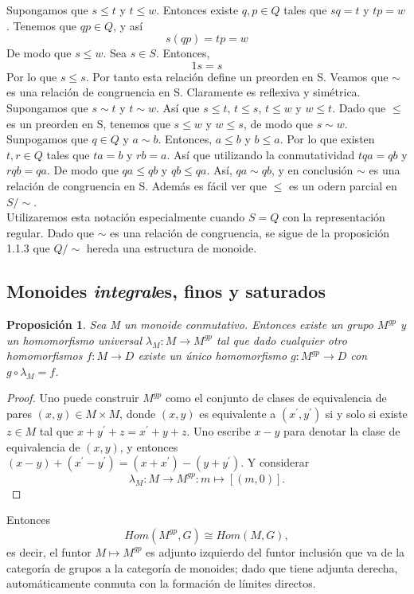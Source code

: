 \documentclass[12pt,spanish]{amsart}
\newtheorem{prop}[Theorem]{Proposición}
\theoremstyle{definition}
\theoremstyle{remark}
\begin{document}
Supongamos que $s\leq t$ y $t\leq w$. Entonces existe $q,p\in Q$ tales que $sq=t$ y $tp=w$. Tenemos que $qp\in Q$, y así
$$s(qp)=tp=w$$
De modo que $s\leq w$. Sea $s\in S$. Entonces,
$$1 s = s $$
Por lo que $s\leq s$. Por tanto esta relación define un preorden en S. Veamos que $\sim$ es una relación de congruencia en S.  Claramente es reflexiva y simétrica. Supongamos que $s\sim t$ y $t\sim w$. Así que $s\leq t$, $t\leq s$, $t\leq w$ y $w\leq t$. Dado que $\leq$ es un preorden en S, tenemos que $s\leq w$ y $w\leq s$, de modo que $s\sim w$. Sunpogamos que $q\in Q$ y $a\sim b$. Entonces, $a\leq b$ y $b\leq a$. Por lo que existen $t,r\in Q$ tales que $ta=b$ y $rb=a$. Así que utilizando la conmutatividad $tqa=qb$ y $rqb=qa$. De modo que $qa\leq qb$ y $qb \leq qa$. Así, $qa \sim qb$, y en conclusión $\sim $ es una relación de congruencia en S. Además es fácil ver que $\leq$ es un odern parcial en $S/ \sim$. \\
Utilizaremos esta notación especialmente cuando $S=Q$ con la representación regular. Dado que $\sim$ es una relación de congruencia, se sigue de la proposición 1.1.3 que $Q/\sim$ hereda una estructura de monoide.








\subsection{Monoides \textit{integral}es, finos y saturados}

\begin{prop}
Sea M un monoide conmutativo. Entonces existe un grupo $M^{gp}$ y un homomorfismo universal $\lambda_{M}:M \to M^{gp}$ tal que dado cualquier otro homomorfismos $f:M \to D$ existe un único homomorfismo $g:M^{gp} \to D$ con  $g\circ \lambda_{M} = f$.  
\end{prop}

\begin{proof}
Uno puede construir $M^{gp}$ como el conjunto de clases de equivalencia de pares $(x,y)\in M\times M$, donde $(x,y)$ es equivalente a $(x^{\prime},y^{\prime})$ si y solo si existe $z\in M$ tal que $x+y^{\prime}+z=x^{\prime}+y+z$. Uno escribe $x-y$ para denotar la clase de equivalencia de $(x,y)$, y entonces $(x-y)+(x^{\prime}-y^{\prime})= (x+x^{\prime})-(y+y^{\prime}).$ Y considerar 
$$\lambda_{M}:M \to M^{gp}:m \mapsto [(m,0)].$$
\end{proof}

Entonces
$$Hom(M^{gp},G) \cong Hom(M,G),$$
es decir, el funtor $M \mapsto M^{gp}$ es adjunto izquierdo del funtor inclusión que va de la categoría de grupos a la categoría de monoides; dado que tiene adjunta derecha, automáticamente conmuta con la formación de límites directos.   
\end{document}
